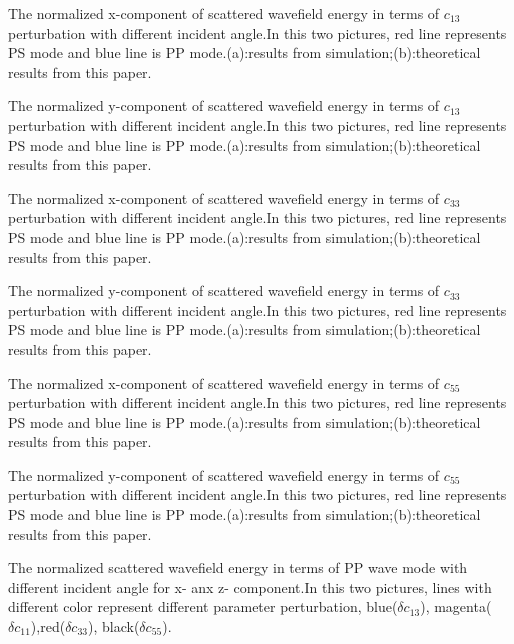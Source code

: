{The normalized x-component of scattered wavefield energy in terms of $c_{13}$ perturbation with
different incident angle.In this two pictures, red line represents PS mode and blue line is PP
	mode.(a):results from simulation;(b):theoretical results from this paper.
	}

{The normalized y-component of scattered wavefield energy in terms of $c_{13}$ perturbation with
different incident angle.In this two pictures, red line represents PS mode and blue line is PP
	mode.(a):results from simulation;(b):theoretical results from this paper.
	}

{The normalized x-component of scattered wavefield energy in terms of $c_{33}$ perturbation with
different incident angle.In this two pictures, red line represents PS mode and blue line is PP
	mode.(a):results from simulation;(b):theoretical results from this paper.
	}

{The normalized y-component of scattered wavefield energy in terms of $c_{33}$ perturbation with
different incident angle.In this two pictures, red line represents PS mode and blue line is PP
	mode.(a):results from simulation;(b):theoretical results from this paper.
	}

{The normalized x-component of scattered wavefield energy in terms of $c_{55}$ perturbation with
different incident angle.In this two pictures, red line represents PS mode and blue line is PP
	mode.(a):results from simulation;(b):theoretical results from this paper.
	}

{The normalized y-component of scattered wavefield energy in terms of $c_{55}$ perturbation with
different incident angle.In this two pictures, red line represents PS mode and blue line is PP
	mode.(a):results from simulation;(b):theoretical results from this paper.
	}

{The normalized scattered wavefield energy in terms of PP wave mode with
different incident angle for x- anx z- component.In this two pictures, lines with
different color represent different parameter perturbation, blue($\delta c_{13}$),
magenta($\delta c_{11}$),red($\delta c_{33}$), black($\delta c_{55}$).
	}


